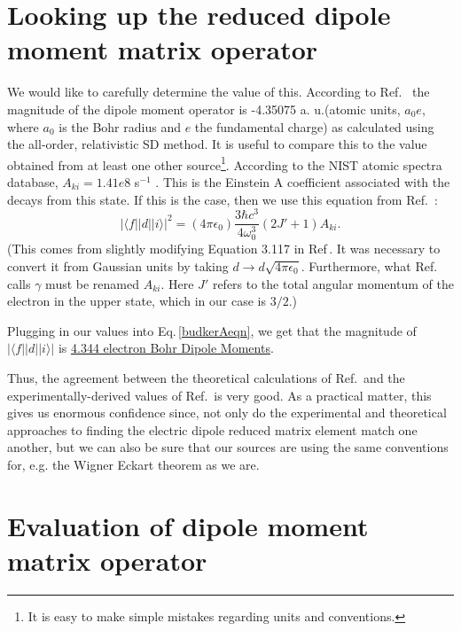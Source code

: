 \section{Looking up the reduced dipole moment matrix operator} \label{lookItUp}
We would like to carefully determine the value of this. According to Ref.\ \cite{safronova2photon} the magnitude of the dipole moment operator is -4.35075 a. u.(atomic units, $a_0 e$, where $a_0$ is the Bohr radius and $e$ the fundamental charge) as calculated using the all-order, relativistic SD method. It is useful to compare this to the value obtained from at least one other source\footnote{It is easy to make simple mistakes regarding units and conventions.}. According to the NIST atomic spectra database, $A_{ki}=1.41e8$ s$^{-1}$ \cite{NISTasd}. This is the Einstein A coefficient associated with the decays from this state. If this is the case, then we use this equation from Ref.\ \cite{demilleBudkerKimball}:  
\begin{equation}
|\langle f ||d|| i \rangle|^2 = (4 \pi \epsilon_0) \frac{3 \hbar c^3}{4 \omega_0^3} (2 J'+1) A_{ki}\label{budkerAeqn}.
\end{equation}
(This comes from slightly modifying Equation 3.117 in Ref\,\cite{demilleBudkerKimball}. It was necessary to convert it from Gaussian units by taking $d\rightarrow d \sqrt{4 \pi \epsilon_0}$. Furthermore, what Ref.\ \cite{demilleBudkerKimball} calls $\gamma$ must be renamed $A_{ki}$. Here $J'$ refers to the total angular momentum of the electron in the upper state, which in our case is $3/2$.) 

Plugging in our values into Eq.\,\ref{budkerAeqn}, we get that the magnitude of $|\langle f ||d|| i \rangle|$ is \href{http://www.wolframalpha.com/input/?i=sqrt%283*hbar*c%5E3%2F%284*%282*pi*c%2F407.771+nm%29%5E3%29*4*pi*epsilon_0*4*1.41e8*1%2Fs%29}{4.344 electron Bohr Dipole Moments}.

Thus, the agreement between the theoretical calculations of Ref.\,\cite{safronova2photon} and the experimentally-derived values of Ref.\,\cite{NISTasd} is very good. As a practical matter, this gives us enormous confidence since, not only do the experimental and theoretical approaches to finding the electric dipole reduced matrix element match one another, but we can also be sure that our sources are using the same conventions for, e.g. the Wigner Eckart theorem as we are.

\section{Evaluation of dipole moment matrix operator}

